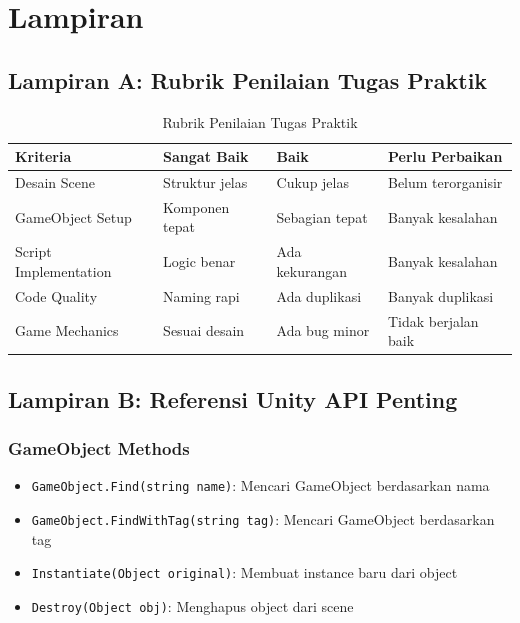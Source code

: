 \chapter*{Lampiran}

\section*{Lampiran A: Rubrik Penilaian Tugas Praktik}

\begin{table}[h]
\centering
\footnotesize
\begin{tabular}{|l|l|l|l|}
\hline
\textbf{Kriteria} & \textbf{Sangat Baik} & \textbf{Baik} & \textbf{Perlu Perbaikan} \\
\hline
Desain Scene & Struktur jelas & Cukup jelas & Belum terorganisir \\
\hline
GameObject Setup & Komponen tepat & Sebagian tepat & Banyak kesalahan \\
\hline
Script Implementation & Logic benar & Ada kekurangan & Banyak kesalahan \\
\hline
Code Quality & Naming rapi & Ada duplikasi & Banyak duplikasi \\
\hline
Game Mechanics & Sesuai desain & Ada bug minor & Tidak berjalan baik \\
\hline
\end{tabular}
\caption{Rubrik Penilaian Tugas Praktik}
\end{table}

\section*{Lampiran B: Referensi Unity API Penting}

\subsection*{GameObject Methods}
\begin{itemize}
  \item \texttt{GameObject.Find(string name)}: Mencari GameObject berdasarkan nama
  \item \texttt{GameObject.FindWithTag(string tag)}: Mencari GameObject berdasarkan tag
  \item \texttt{Instantiate(Object original)}: Membuat instance baru dari object
  \item \texttt{Destroy(Object obj)}: Menghapus object dari scene
\end{itemize}

